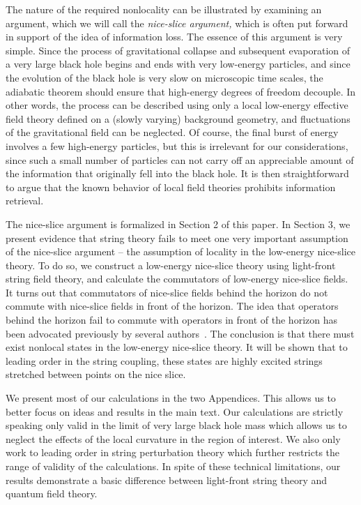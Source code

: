 The nature of the required nonlocality can be illustrated by
examining an argument, which we will call the {\it nice-slice
argument,} which is often put forward in support of the idea of
information loss.  The essence of this argument is very simple.
Since the process of gravitational collapse and subsequent
evaporation of a very large black hole begins and ends with very
low-energy particles, and since the evolution of the black hole is
very
slow on microscopic time scales, the adiabatic theorem should ensure
that high-energy degrees of freedom decouple.  In other words, the
process can be described using only a local low-energy effective
field theory defined on a (slowly varying) background geometry, and
fluctuations of the gravitational field can be neglected.  Of course,
the final burst of energy involves a few high-energy particles,
but this is irrelevant for our considerations, since such a small
number of particles can not carry off an appreciable amount of the
information that originally fell into the black hole.  It is then
straightforward to argue that the known behavior of local field
theories prohibits information retrieval.

The nice-slice argument is formalized in Section 2 of this paper.  In
Section 3, we present evidence that string theory fails to meet one
very important assumption of the nice-slice argument -- the
assumption of locality in the low-energy nice-slice theory.  To do
so, we construct a low-energy nice-slice theory using light-front
string field theory, and calculate the commutators of low-energy
nice-slice fields.  It turns out that commutators of nice-slice
fields behind the horizon do not commute with nice-slice fields in
front of the horizon.  The idea that operators behind the horizon
fail to commute with operators in front of the horizon has been
advocated previously by several authors~.
The conclusion is that there must exist nonlocal states in the
low-energy nice-slice theory.  It will be shown that to leading order
in the string coupling, these states are highly excited strings
stretched between points on the nice slice.

We present most of our calculations in the two Appendices.  This
allows us to better focus on ideas and results in the main text.
Our calculations are strictly
speaking only valid in the limit of very large black hole mass which
allows us to neglect the effects of the local curvature in the region
of interest.  We also only work to leading order in string
perturbation theory which further restricts the range of validity of
the calculations.  In spite of these
technical limitations, our results demonstrate a basic difference
between light-front string theory and quantum field theory.

